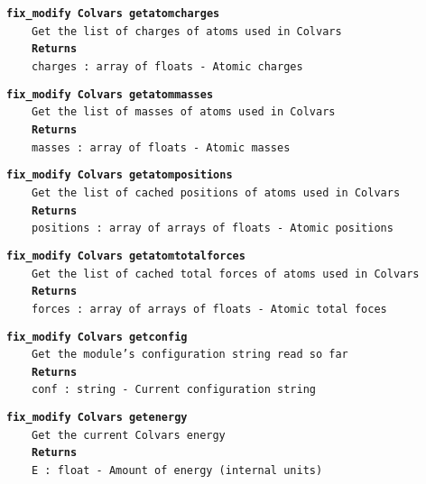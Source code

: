 \begin{mdexampleinput}{}
\texttt{\textbf{fix\_modify Colvars getatomcharges}}
\\
\-~~~~\texttt{Get the list of charges of atoms used in Colvars}
\\
\-~~~~\texttt{\textbf{Returns}}
\\
\-~~~~\texttt{charges : array of floats - Atomic charges}
\end{mdexampleinput}
\begin{mdexampleinput}{}
\texttt{\textbf{fix\_modify Colvars getatommasses}}
\\
\-~~~~\texttt{Get the list of masses of atoms used in Colvars}
\\
\-~~~~\texttt{\textbf{Returns}}
\\
\-~~~~\texttt{masses : array of floats - Atomic masses}
\end{mdexampleinput}
\begin{mdexampleinput}{}
\texttt{\textbf{fix\_modify Colvars getatompositions}}
\\
\-~~~~\texttt{Get the list of cached positions of atoms used in Colvars}
\\
\-~~~~\texttt{\textbf{Returns}}
\\
\-~~~~\texttt{positions : array of arrays of floats - Atomic positions}
\end{mdexampleinput}
\begin{mdexampleinput}{}
\texttt{\textbf{fix\_modify Colvars getatomtotalforces}}
\\
\-~~~~\texttt{Get the list of cached total forces of atoms used in Colvars}
\\
\-~~~~\texttt{\textbf{Returns}}
\\
\-~~~~\texttt{forces : array of arrays of floats - Atomic total foces}
\end{mdexampleinput}
\begin{mdexampleinput}{}
\texttt{\textbf{fix\_modify Colvars getconfig}}
\\
\-~~~~\texttt{Get the module's configuration string read so far}
\\
\-~~~~\texttt{\textbf{Returns}}
\\
\-~~~~\texttt{conf : string - Current configuration string}
\end{mdexampleinput}
\begin{mdexampleinput}{}
\texttt{\textbf{fix\_modify Colvars getenergy}}
\\
\-~~~~\texttt{Get the current Colvars energy}
\\
\-~~~~\texttt{\textbf{Returns}}
\\
\-~~~~\texttt{E : float - Amount of energy (internal units)}
\end{mdexampleinput}
